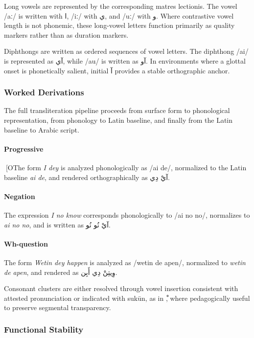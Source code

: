 \documentclass[12pt]{article}
\newcommand{\AR}[1]{\foreignlanguage{arabic}{#1}}
\begin{document}
Long vowels are represented by the corresponding matres lectionis. The vowel /aː/ is written with \AR{ا}, /iː/ with \AR{ي}, and /uː/ with \AR{و}. Where contrastive vowel length is not phonemic, these long-vowel letters function primarily as quality markers rather than as duration markers.

Diphthongs are written as ordered sequences of vowel letters. The diphthong /ai/ is represented as \AR{آي}, while /au/ is written as \AR{آو}. In environments where a glottal onset is phonetically salient, initial \AR{آ} provides a stable orthographic anchor.

\subsubsection{Worked Derivations}

The full transliteration pipeline proceeds from surface form to phonological representation, from phonology to Latin baseline, and finally from the Latin baseline to Arabic script.

\paragraph{Progressive}

[OThe form \textit{I dey} is analyzed phonologically as /ai de/, normalized to the Latin baseline \textit{ai de}, and rendered orthographically as \AR{آيْ دِي}.

\paragraph{Negation}

The expression \textit{I no know} corresponds phonologically to /ai no no/, normalizes to \textit{ai no no}, and is written as \AR{آيْ نُو نُو}.

\paragraph{Wh-question}

The form \textit{Wetin dey happen} is analyzed as /wetin de apen/, normalized to \textit{wetin de apen}, and rendered as \AR{وِيتِنْ دِي أَبِن}.

Consonant clusters are either resolved through vowel insertion consistent with attested pronunciation or indicated with suk\={u}n, as in \AR{ْ}, where pedagogically useful to preserve segmental transparency.

\subsubsection{Functional Stability}
\end{document}
